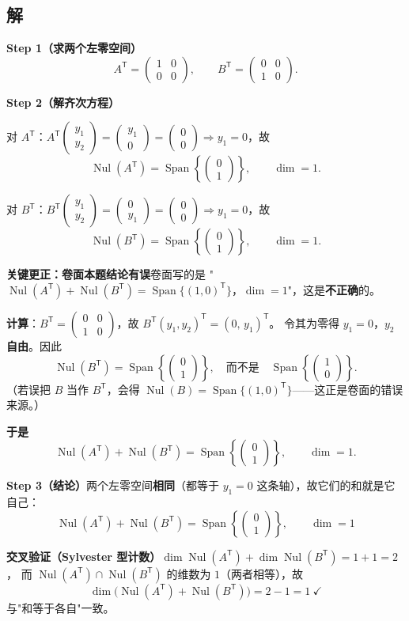 \documentclass[10pt]{ctexart}
\newcommand{\Nul}{\operatorname{Nul}}
\newcommand{\Span}{\operatorname{Span}}
\newcommand{\TT}{^{\mathsf T}}
\newcommand{\bv}[1]{\begin{pmatrix}#1\end{pmatrix}}
\begin{document}
\subsection*{解}

\textbf{Step 1（求两个左零空间）}\quad
\[
A\TT=\bv{1&0\\0&0},\qquad B\TT=\bv{0&0\\1&0} .
\]

\textbf{Step 2（解齐次方程）}\quad

对 $A\TT$：$A\TT\bv{y_1\\y_2}=\bv{y_1\\0}=\bv{0\\0}\Rightarrow y_1=0$，故
\[
\Nul(A\TT)=\Span\left\{\bv{0\\1}\right\},\qquad \dim=1 .
\]

对 $B\TT$：$B\TT\bv{y_1\\y_2}=\bv{0\\y_1}=\bv{0\\0}\Rightarrow y_1=0$，故
\[
\Nul(B\TT)=\Span\left\{\bv{0\\1}\right\},\qquad \dim=1 .
\]

\begin{fixbox}
\textbf{关键更正：卷面本题结论有误}\quad 卷面写的是
"$\Nul(A\TT)+\Nul(B\TT)=\Span\{(1,0)\TT\}$，$\dim=1$"，这是\textbf{不正确}的。

\textbf{计算}：$B\TT=\bv{0&0\\1&0}$，故 $B\TT(y_1,y_2)\TT=(0,\,y_1)\TT$。
令其为零得 $y_1=0$，$y_2$ \textbf{自由}。因此
\[
\Nul(B\TT)=\Span\left\{\bv{0\\1}\right\},\quad\text{而不是}\quad\Span\left\{\bv{1\\0}\right\}.
\]
（若误把 $B$ 当作 $B\TT$，会得 $\Nul(B)=\Span\{(1,0)\TT\}$——这正是卷面的错误来源。）

\textbf{于是}
\[
\Nul(A\TT)+\Nul(B\TT)=\Span\left\{\bv{0\\1}\right\},\qquad \dim=1 .
\]
\end{fixbox}

\textbf{Step 3（结论）}\quad 两个左零空间\textbf{相同}（都等于 $y_1=0$ 这条轴），故它们的和就是它自己：
\[
\boxed{\ \Nul(A\TT)+\Nul(B\TT)=\Span\left\{\bv{0\\1}\right\},\qquad \dim=1\ }
\]

\textbf{交叉验证（Sylvester 型计数）}\quad $\dim\Nul(A\TT)+\dim\Nul(B\TT)=1+1=2$，
而 $\Nul(A\TT)\cap\Nul(B\TT)$ 的维数为 $1$（两者相等），故
\[
\dim\big(\Nul(A\TT)+\Nul(B\TT)\big)=2-1=1\ \checkmark
\]
与"和等于各自"一致。
\end{document}
